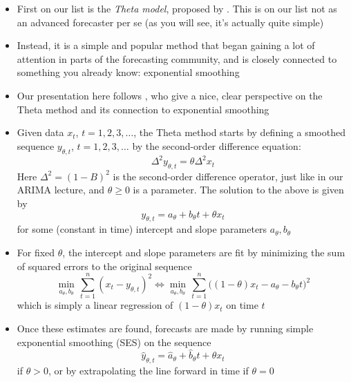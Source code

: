 \documentclass{article}
\begin{document}
\begin{itemize}
\item First on our list is the \emph{Theta model}, proposed by
  \citet{assimakopoulos2000theta}. This is on our list not as an advanced
  forecaster per se (as you will see, it's actually quite simple)

\item Instead, it is a simple and popular method that began gaining a lot of
  attention in parts of the forecasting community, and is closely connected to
  something you already know: exponential smoothing    

\item Our presentation here follows \citet{hyndman2003unmasking}, who give a
  nice, clear perspective on the Theta method and its connection to exponential
  smoothing  

\item Given data $x_t$, $t = 1,2,3,\dots$, the Theta method starts by defining a
  smoothed sequence $y_{\theta,t}$, $t = 1,2,3,\dots$ by the second-order
  difference equation:
  \[
  \Delta^2 y_{\theta,t} = \theta \Delta^2 x_t 
  \]
  Here $\Delta^2 = (1-B)^2$ is the second-order difference operator, just like
  in our ARIMA lecture, and $\theta \geq 0$ is a parameter. The solution to the 
  above is given by  
  \[
  y_{\theta,t} = a_\theta + b_\theta t + \theta x_t
  \]
  for some (constant in time) intercept and slope parameters $a_\theta,
  b_\theta$  

\item For fixed $\theta$, the intercept and slope parameters are fit by
  minimizing the sum of squared errors to the original sequence  
  \[
  \min_{a_\theta, b_\theta} \, \sum_{t=1}^n (x_t - y_{\theta,t})^2 \iff
  \min_{a_\theta, b_\theta} \, \sum_{t=1}^n \Big( (1-\theta) x_t - a_\theta -
  b_\theta t  \Big)^2 
  \]
  which is simply a linear regression of $(1-\theta) x_t$ on time $t$ 

\item Once these estimates  are found,
  forecasts are made by running simple exponential smoothing (SES) on the
  sequence  
  \[
  \hat{y}_{\theta,t} = \hat{a}_\theta + \hat{b}_\theta t + \theta x_t
  \]
  if $\theta > 0$, or by extrapolating the line  forward in time if $\theta = 0$


\end{itemize}
\end{document}
